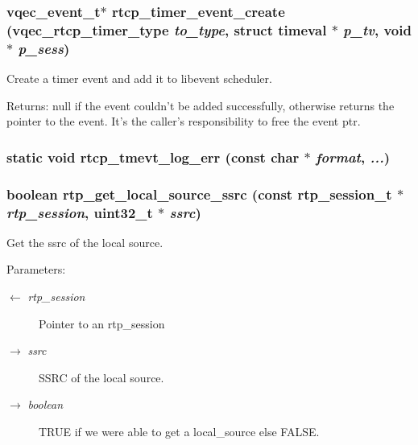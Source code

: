 \subsubsection{\setlength{\rightskip}{0pt plus 5cm}vqec\_\-event\_\-t$\ast$ rtcp\_\-timer\_\-event\_\-create (\bf{vqec\_\-rtcp\_\-timer\_\-type} {\em to\_\-type}, struct timeval $\ast$ {\em p\_\-tv}, void $\ast$ {\em p\_\-sess})}\label{vqec__rtp_8c_4083ee4b737ceb7aaffc7e0738b543a0}


Create a timer event and add it to libevent scheduler. \begin{Desc}
\item[Returns:]null if the event couldn't be added successfully, otherwise returns the pointer to the event. It's the caller's responsibility to free the event ptr. \end{Desc}
\subsubsection{\setlength{\rightskip}{0pt plus 5cm}static void rtcp\_\-tmevt\_\-log\_\-err (const char $\ast$ {\em format},  {\em ...})\hspace{0.3cm}{\tt  [static]}}\label{vqec__rtp_8c_be793b329c37047ec24293c951066395}


\subsubsection{\setlength{\rightskip}{0pt plus 5cm}boolean rtp\_\-get\_\-local\_\-source\_\-ssrc (const rtp\_\-session\_\-t $\ast$ {\em rtp\_\-session}, uint32\_\-t $\ast$ {\em ssrc})}\label{vqec__rtp_8c_63ae673e310741ef9ef8b004218ad1bd}


Get the ssrc of the local source.

\begin{Desc}
\item[Parameters:]
\begin{description}
\item[\mbox{$\leftarrow$} {\em rtp\_\-session}]Pointer to an rtp\_\-session \item[\mbox{$\rightarrow$} {\em ssrc}]SSRC of the local source. \item[\mbox{$\rightarrow$} {\em boolean}]TRUE if we were able to get a local\_\-source else FALSE. \end{description}
\end{Desc}
